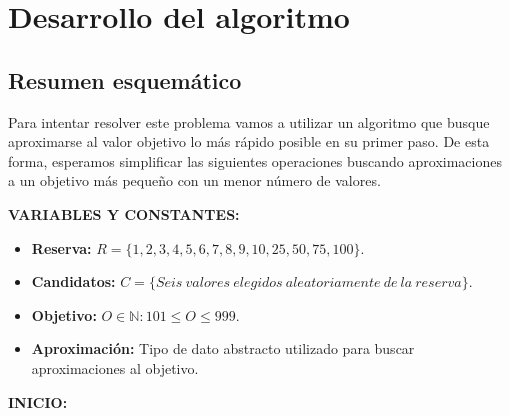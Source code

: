 \chapter{Desarrollo del algoritmo}

\section{Resumen esquemático}

Para intentar resolver este problema vamos a utilizar un algoritmo que busque aproximarse al valor objetivo lo más rápido posible en su primer paso.
De esta forma, esperamos simplificar las siguientes operaciones buscando aproximaciones a un objetivo más pequeño con un menor número de valores.

\textbf{VARIABLES Y CONSTANTES:}

\begin{itemize}
	\item\textbf{Reserva:} $R=\{1,2,3,4,5,6,7,8,9,10,25,50,75,100\}$.
	\item\textbf{Candidatos:} $C=\{Seis\ valores\ elegidos\ aleatoriamente\ de\ la\ reserva\}$.
	\item\textbf{Objetivo:} $O\in\mathbb{N}:101\leq O\leq999$.
	\item\textbf{Aproximación:} Tipo de dato abstracto utilizado para buscar aproximaciones al objetivo.
\end{itemize}

\textbf{INICIO:}

